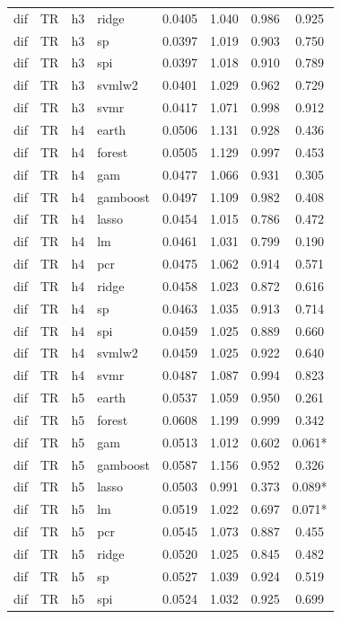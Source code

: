 \begin{ThreePartTable}
\begin{longtable}[t]{llclcccc}
dif & TR & h3 & ridge & 0.0405 & 1.040 & 0.986 & 0.925\\
dif & TR & h3 & sp & 0.0397 & 1.019 & 0.903 & 0.750\\
dif & TR & h3 & spi & 0.0397 & 1.018 & 0.910 & 0.789\\
dif & TR & h3 & svmlw2 & 0.0401 & 1.029 & 0.962 & 0.729\\
dif & TR & h3 & svmr & 0.0417 & 1.071 & 0.998 & 0.912\\
\addlinespace
dif & TR & h4 & earth & 0.0506 & 1.131 & 0.928 & 0.436\\
dif & TR & h4 & forest & 0.0505 & 1.129 & 0.997 & 0.453\\
dif & TR & h4 & gam & 0.0477 & 1.066 & 0.931 & 0.305\\
dif & TR & h4 & gamboost & 0.0497 & 1.109 & 0.982 & 0.408\\
dif & TR & h4 & lasso & 0.0454 & 1.015 & 0.786 & 0.472\\
dif & TR & h4 & lm & 0.0461 & 1.031 & 0.799 & 0.190\\
dif & TR & h4 & pcr & 0.0475 & 1.062 & 0.914 & 0.571\\
dif & TR & h4 & ridge & 0.0458 & 1.023 & 0.872 & 0.616\\
dif & TR & h4 & sp & 0.0463 & 1.035 & 0.913 & 0.714\\
dif & TR & h4 & spi & 0.0459 & 1.025 & 0.889 & 0.660\\
dif & TR & h4 & svmlw2 & 0.0459 & 1.025 & 0.922 & 0.640\\
dif & TR & h4 & svmr & 0.0487 & 1.087 & 0.994 & 0.823\\
\addlinespace
dif & TR & h5 & earth & 0.0537 & 1.059 & 0.950 & 0.261\\
dif & TR & h5 & forest & 0.0608 & 1.199 & 0.999 & 0.342\\
dif & TR & h5 & gam & 0.0513 & 1.012 & 0.602 & 0.061*\\
dif & TR & h5 & gamboost & 0.0587 & 1.156 & 0.952 & 0.326\\
dif & TR & h5 & lasso & 0.0503 & 0.991 & 0.373 & 0.089*\\
dif & TR & h5 & lm & 0.0519 & 1.022 & 0.697 & 0.071*\\
dif & TR & h5 & pcr & 0.0545 & 1.073 & 0.887 & 0.455\\
dif & TR & h5 & ridge & 0.0520 & 1.025 & 0.845 & 0.482\\
dif & TR & h5 & sp & 0.0527 & 1.039 & 0.924 & 0.519\\
dif & TR & h5 & spi & 0.0524 & 1.032 & 0.925 & 0.699\\

\end{longtable}
\end{ThreePartTable}

